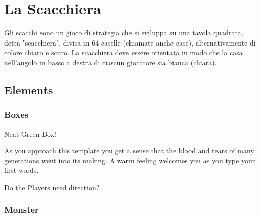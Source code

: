 \documentclass[10pt,twoside,onecolumn]{article}
\begin{document}
	\tableofcontents
	\newpage
	
	\section{La Scacchiera}
	Gli scacchi sono un gioco di strategia che si sviluppa su una tavola quadrata, detta "scacchiera", divisa in 64 caselle (chiamate anche case), alternativamente di colore chiaro e scuro. La scacchiera deve essere orientata in modo che la casa nell'angolo in basso a destra di ciascun giocatore sia bianca (chiara).
	
	\begin{figure}[h]
		\centering
		\chessboard[showmover=false, 
		pgfstyle=border,
		linewidth=0.01ex,
		backregions={a8-a8, h1-h1},
		labeltoplift=2mm, %
		label=true,
		hlabel=false,
		vlabel=false
		]
		\caption{}
	\end{figure}


\subsection{Elements}
\subsubsection{Boxes}

\begin{commentbox}{Neat Green Box!}
    \lipsum[2]
\end{commentbox}

\begin{quotebox}
    As you approach this template you get a sense that the blood and tears of many generations went into its making. A warm feeling welcomes you as you type your first words.
\end{quotebox}

\begin{paperbox}{Do the Players need direction?}
    \lipsum[2]
\end{paperbox}


\subsubsection{Monster}
\end{document}
